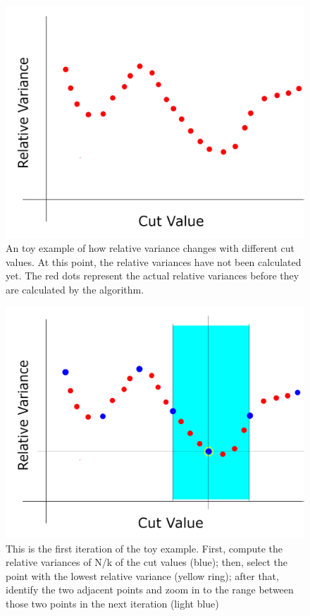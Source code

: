 \begin{figure}[htbp]
	\centering
	\includegraphics[height=0.25 \textheight]{"fig/cbla/divide-and-zoom-in_1"}
	\caption[Illustration explaining the "Divid-and-Zoom-In" region split values computation method 1]{An toy example of how relative variance changes with different cut values. At this point, the relative variances have not been calculated yet. The red dots represent the actual relative variances before they are calculated by the algorithm.}
	\label{fig:divide-and-zoom-in_1}
\end{figure}	
\begin{figure}[htbp]
	\centering
	\includegraphics[height=0.3 \textheight]{"fig/cbla/divide-and-zoom-in_2"}
	\caption[Illustration explaining the "Divid-and-Zoom-In" region split values computation method 2]{This is the first iteration of the toy example. First, compute the relative variances of N/k of the cut values (blue); then, select the point with the lowest relative variance (yellow ring); after that, identify the two adjacent points and zoom in to the range between those two points in the next iteration (light blue)}
	\label{fig:divide-and-zoom-in_2}
\end{figure}	
